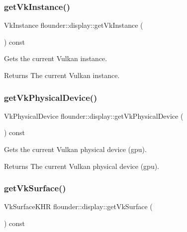 \subsubsection{\texorpdfstring{get\+Vk\+Instance()}{getVkInstance()}}
{\footnotesize\ttfamily Vk\+Instance flounder\+::display\+::get\+Vk\+Instance (\begin{DoxyParamCaption}{ }\end{DoxyParamCaption}) const\hspace{0.3cm}{\ttfamily [inline]}}



Gets the current Vulkan instance. 

\begin{DoxyReturn}{Returns}
The current Vulkan instance. 
\end{DoxyReturn}
\mbox{\label{classflounder_1_1display_a6599c6384b8174f97318956f8644e63c}} 
\subsubsection{\texorpdfstring{get\+Vk\+Physical\+Device()}{getVkPhysicalDevice()}}
{\footnotesize\ttfamily Vk\+Physical\+Device flounder\+::display\+::get\+Vk\+Physical\+Device (\begin{DoxyParamCaption}{ }\end{DoxyParamCaption}) const\hspace{0.3cm}{\ttfamily [inline]}}



Gets the current Vulkan physical device (gpu). 

\begin{DoxyReturn}{Returns}
The current Vulkan physical device (gpu). 
\end{DoxyReturn}
\mbox{\label{classflounder_1_1display_a8f3f994b876429d4b6440520b21f13fa}} 
\subsubsection{\texorpdfstring{get\+Vk\+Surface()}{getVkSurface()}}
{\footnotesize\ttfamily Vk\+Surface\+K\+HR flounder\+::display\+::get\+Vk\+Surface (\begin{DoxyParamCaption}{ }\end{DoxyParamCaption}) const\hspace{0.3cm}{\ttfamily [inline]}}



